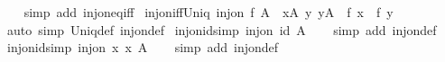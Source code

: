 \begin{isabellebody}
%
\isadelimproof
\ \ %
\endisadelimproof
%
\isatagproof
{}\isamarkupfalse%
\ {\isacharparenleft}{\kern0pt}simp\ add{\isacharcolon}{\kern0pt}\ inj{\isacharunderscore}{\kern0pt}on{\isacharunderscore}{\kern0pt}eq{\isacharunderscore}{\kern0pt}iff{\isacharparenright}{\kern0pt}%
\endisatagproof
{\isafoldproof}%
%
\isadelimproof
\isanewline
%
\endisadelimproof
\isanewline
{}\isamarkupfalse%
\ inj{\isacharunderscore}{\kern0pt}on{\isacharunderscore}{\kern0pt}iff{\isacharunderscore}{\kern0pt}Uniq{\isacharcolon}{\kern0pt}\ {\isachardoublequoteopen}inj{\isacharunderscore}{\kern0pt}on\ f\ A\ {\isasymlongleftrightarrow}\ {\isacharparenleft}{\kern0pt}{\isasymforall}x{\isasymin}A{\isachardot}{\kern0pt}\ {\isasymexists}\isactrlsub {\isasymle}y{\isachardot}{\kern0pt}\ y{\isasymin}A\ {\isasymand}\ f\ x\ {\isacharequal}{\kern0pt}\ f\ y{\isacharparenright}{\kern0pt}{\isachardoublequoteclose}\isanewline
%
\isadelimproof
\ \ %
\endisadelimproof
%
\isatagproof
{}\isamarkupfalse%
\ {\isacharparenleft}{\kern0pt}auto\ simp{\isacharcolon}{\kern0pt}\ Uniq{\isacharunderscore}{\kern0pt}def\ inj{\isacharunderscore}{\kern0pt}on{\isacharunderscore}{\kern0pt}def{\isacharparenright}{\kern0pt}%
\endisatagproof
{\isafoldproof}%
%
\isadelimproof
\isanewline
%
\endisadelimproof
\isanewline
{}\isamarkupfalse%
\ inj{\isacharunderscore}{\kern0pt}on{\isacharunderscore}{\kern0pt}id{\isacharbrackleft}{\kern0pt}simp{\isacharbrackright}{\kern0pt}{\isacharcolon}{\kern0pt}\ {\isachardoublequoteopen}inj{\isacharunderscore}{\kern0pt}on\ id\ A{\isachardoublequoteclose}\isanewline
%
\isadelimproof
\ \ %
\endisadelimproof
%
\isatagproof
{}\isamarkupfalse%
\ {\isacharparenleft}{\kern0pt}simp\ add{\isacharcolon}{\kern0pt}\ inj{\isacharunderscore}{\kern0pt}on{\isacharunderscore}{\kern0pt}def{\isacharparenright}{\kern0pt}%
\endisatagproof
{\isafoldproof}%
%
\isadelimproof
\isanewline
%
\endisadelimproof
\isanewline
{}\isamarkupfalse%
\ inj{\isacharunderscore}{\kern0pt}on{\isacharunderscore}{\kern0pt}id{}{\isacharbrackleft}{\kern0pt}simp{\isacharbrackright}{\kern0pt}{\isacharcolon}{\kern0pt}\ {\isachardoublequoteopen}inj{\isacharunderscore}{\kern0pt}on\ {\isacharparenleft}{\kern0pt}{\isasymlambda}x{\isachardot}{\kern0pt}\ x{\isacharparenright}{\kern0pt}\ A{\isachardoublequoteclose}\isanewline
%
\isadelimproof
\ \ %
\endisadelimproof
%
\isatagproof
{}\isamarkupfalse%
\ {\isacharparenleft}{\kern0pt}simp\ add{\isacharcolon}{\kern0pt}\ inj{\isacharunderscore}{\kern0pt}on{\isacharunderscore}{\kern0pt}def{\isacharparenright}{\kern0pt}%

\end{isabellebody}
